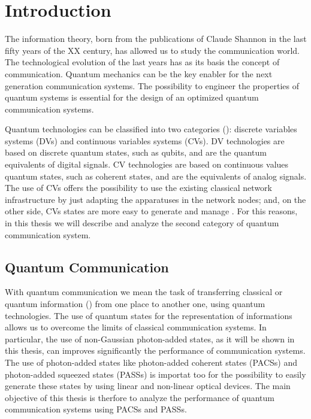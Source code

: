 \chapter{Introduction}
    The information theory, born from the publications of Claude Shannon in 
    the last fifty years of the XX century, has allowed us to study the communication
    world. The technological evolution of the last years has as its basis the concept of
    communication.
    Quantum mechanics can be the key enabler for the next generation communication systems.
    The possibility to engineer the properties of quantum systems is essential for the design
    of an optimized quantum communication systems.

    Quantum technologies can be classified into two categories (\cite{tesiGuerrini}): discrete 
    variables systems (DVs) and continuous variables systems (CVs). DV technologies are based
    on discrete quantum states, such as qubits, and are the quantum equivalents of digital
    signals. CV technologies are based on continuous values quantum states, such as 
    coherent states, and are the equivalents of analog signals.
    The use of CVs offers the possibility to use the existing classical network
    infrastructure by just adapting the apparatuses in the network nodes; and, on the other
    side, CVs states are more easy to generate and manage \cite{tesiGuerrini}.
    For this reasons, in this thesis we will describe and analyze the second category of quantum
    communication system.

    \section{Quantum Communication}
        With quantum communication we mean the task of transferring classical or quantum information
        (\cite{GueChiWinCon:C20,GueChiWinCon:C19,GueChiCon:C18,ChiConWin:J20}) from one place to another
        one, using quantum technologies.
        The use of quantum states for the representation of informations allows us to overcome the 
        limits of classical communication systems.
        In particular, the use of non-Gaussian photon-added states, as it will be shown in this thesis,
        can improves significantly the performance of communication systems. 
        The use of photon-added states like photon-added coherent states (PACSs) and photon-added 
        squeezed states (PASSs) is importat too for the possibility to easily generate these states
        by using linear and non-linear optical devices.
        The main objective of this thesis is therfore to analyze the performance of quantum 
        communication systems using PACSs 
        \cite{PAPACSDisc,GueChiWinCon:C20,GueChiWinCon:C19,GueChiCon:C18} and PASSs.

